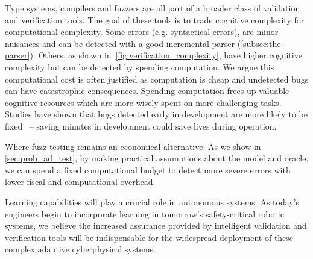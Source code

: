 Type systems, compilers and fuzzers are all part of a broader class of validation and verification tools. The goal of these tools is to trade cognitive complexity for computational complexity. Some errors (e.g. syntactical errors), are minor nuisances and can be detected with a good incremental parser (\autoref{subsec:the-parser}). Others, as shown in~\autoref{fig:verification_complexity}, have higher cognitive complexity but can be detected by spending computation. We argue this computational cost is often justified as computation is cheap and undetected bugs can have catastrophic consequences. Spending computation frees up valuable cognitive resources which are more wisely spent on more challenging tasks. Studies have shown that bugs detected early in development are more likely to be fixed~\citep{distefano2019scaling} -- saving minutes in development could save lives during operation.

Where fuzz testing remains an economical alternative. As we show in \autoref{sec:prob_ad_test}, by making practical assumptions about the model and oracle, we can spend a fixed computational budget to detect more severe errors with lower fiscal and computational overhead.

Learning capabilities will play a crucial role in autonomous systems. As today's engineers begin to incorporate learning in tomorrow's safety-critical robotic systems, we believe the increased assurance provided by intelligent validation and verification tools will be indispensable for the widespread deployment of these complex adaptive cyberphysical systems.